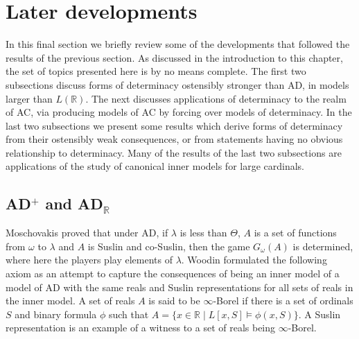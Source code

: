 \documentclass{book}%
\def\underTilde#1{{\baselineskip=0pt\vtop{\hbox{$#1$}\hbox{$\sim$}}}{}}
\newcommand{\uTSigma}{\underTilde{\Sigma}}
\begin{document}







\section{Later developments}

In this final section we briefly review some of the developments that followed the results of
the previous section. As discussed in the introduction to this chapter, the set of topics presented
here is by no means complete. The first two subsections discuss forms of determinacy ostensibly stronger than AD,
in models larger than $L(\mathbb{R})$. The next discusses applications of determinacy to the realm of AC, via
producing models of AC by forcing over models of determinacy. In the last two subsections we present some results
which derive forms of determinacy from their ostensibly weak consequences, or from statements having no obvious relationship
to determinacy. Many of the results of the last two subsections are applications of the study of canonical inner models
for large cardinals.

\subsection{\rm{AD}$^{+}$ and \rm{AD}$_{\mathbb{R}}$}\label{adpadr}

Moschovakis  proved that under AD, if
$\lambda$ is less than $\Theta$, $A$ is a set of functions from
$\omega$ to $\lambda$ and $A$ is Suslin and co-Suslin, then the game
$G_{\omega}(A)$ is determined, where here the players play elements of $\lambda$.
Woodin formulated the following axiom as an attempt to
capture the consequences of being an inner model of a model of AD with the same reals
and Suslin representations for all sets of reals in the inner model. A set of reals $A$ is
said to be $\infty$-Borel if there is a set of ordinals $S$ and binary formula $\phi$ such
that $A = \{ x \in \mathbb{R} \mid L[x,S] \models \phi(x,S)\}$. A Suslin representation
is an example of a witness to a set of reals being $\infty$-Borel.
\end{document}
